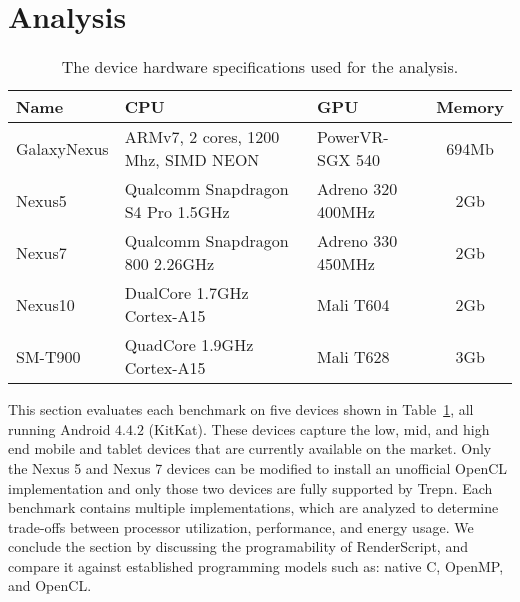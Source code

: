 \section{Analysis}
\label{sec:analysis}


\begin{table}
\centering
\begin{tabular}{ | l | p{2.1cm} | p{1.7cm} | c |}
    \hline 
    Name & CPU & GPU & Memory \\ \hline
    GalaxyNexus & ARMv7, 2 cores, 1200 Mhz, SIMD NEON & PowerVR-SGX 540 & 694Mb \\ \hline
    Nexus5 & Qualcomm Snapdragon S4 Pro 1.5GHz & Adreno 320 400MHz & 2Gb \\ \hline
    Nexus7 & Qualcomm Snapdragon 800 2.26GHz & Adreno 330 450MHz & 2Gb \\ \hline
    Nexus10 & DualCore 1.7GHz Cortex-A15 & Mali T604 & 2Gb \\ \hline
    SM-T900 & QuadCore 1.9GHz Cortex-A15 & Mali T628 & 3Gb \\ \hline
    \hline
\end{tabular}
\caption{The device hardware specifications used for the analysis.}
\label{table:hardware}
\end{table}

This section evaluates each benchmark on five devices shown
  in Table~\ref{table:hardware}, all running Android $4.4.2$ (KitKat).
These devices capture the low, mid, and high end mobile and tablet
  devices that are currently available on the market.
Only the Nexus 5 and Nexus 7 devices can be modified to install an
  unofficial OpenCL implementation and only those two devices are fully supported
  by Trepn.
Each benchmark contains multiple implementations, which 
  are analyzed to determine trade-offs between
  processor utilization, performance, and energy usage.
We conclude the section by discussing the programability of RenderScript,
  and compare it against established programming models such as:
  native C, OpenMP, and OpenCL.







